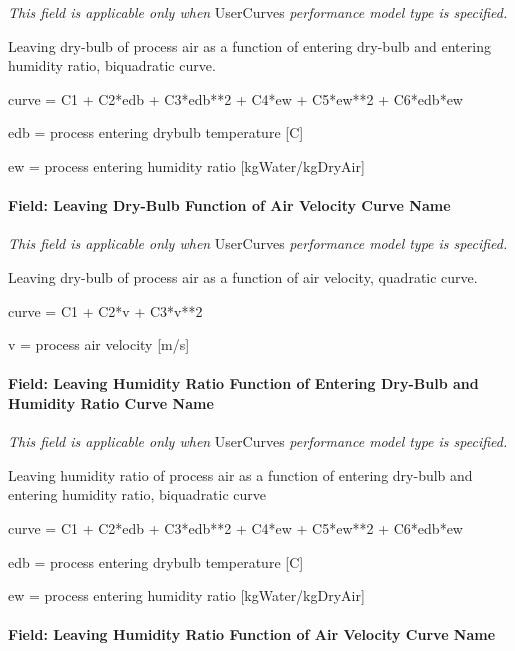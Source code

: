 \emph{This field is applicable only when} UserCurves \emph{performance model type is specified.}

Leaving dry-bulb of process air as a function of entering dry-bulb and entering humidity ratio, biquadratic curve.

curve = C1 + C2*edb + C3*edb**2 + C4*ew + C5*ew**2 + C6*edb*ew

edb = process entering drybulb temperature {[}C{]}

ew = process entering humidity ratio {[}kgWater/kgDryAir{]}

\paragraph{Field: Leaving Dry-Bulb Function of Air Velocity Curve Name}\label{field-leaving-dry-bulb-function-of-air-velocity-curve-name}

\emph{This field is applicable only when} UserCurves \emph{performance model type is specified.}

Leaving dry-bulb of process air as a function of air velocity, quadratic curve.

curve = C1 + C2*v + C3*v**2

v = process air velocity {[}m/s{]}

\paragraph{Field: Leaving Humidity Ratio Function of Entering Dry-Bulb and Humidity Ratio Curve Name}\label{field-leaving-humidity-ratio-function-of-entering-dry-bulb-and-humidity-ratio-curve-name}

\emph{This field is applicable only when} UserCurves \emph{performance model type is specified.}

Leaving humidity ratio of process air as a function of entering dry-bulb and entering humidity ratio, biquadratic curve

curve = C1 + C2*edb + C3*edb**2 + C4*ew + C5*ew**2 + C6*edb*ew

edb = process entering drybulb temperature {[}C{]}

ew = process entering humidity ratio {[}kgWater/kgDryAir{]}

\paragraph{Field: Leaving Humidity Ratio Function of Air Velocity Curve Name}\label{field-leaving-humidity-ratio-function-of-air-velocity-curve-name}

